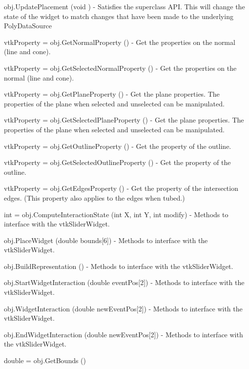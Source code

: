 \begin{DoxyItemize}
\item {\ttfamily obj.\-Update\-Placement (void )} -\/ Satisfies the superclass A\-P\-I. This will change the state of the widget to match changes that have been made to the underlying Poly\-Data\-Source  
\item {\ttfamily vtk\-Property = obj.\-Get\-Normal\-Property ()} -\/ Get the properties on the normal (line and cone).  
\item {\ttfamily vtk\-Property = obj.\-Get\-Selected\-Normal\-Property ()} -\/ Get the properties on the normal (line and cone).  
\item {\ttfamily vtk\-Property = obj.\-Get\-Plane\-Property ()} -\/ Get the plane properties. The properties of the plane when selected and unselected can be manipulated.  
\item {\ttfamily vtk\-Property = obj.\-Get\-Selected\-Plane\-Property ()} -\/ Get the plane properties. The properties of the plane when selected and unselected can be manipulated.  
\item {\ttfamily vtk\-Property = obj.\-Get\-Outline\-Property ()} -\/ Get the property of the outline.  
\item {\ttfamily vtk\-Property = obj.\-Get\-Selected\-Outline\-Property ()} -\/ Get the property of the outline.  
\item {\ttfamily vtk\-Property = obj.\-Get\-Edges\-Property ()} -\/ Get the property of the intersection edges. (This property also applies to the edges when tubed.)  
\item {\ttfamily int = obj.\-Compute\-Interaction\-State (int X, int Y, int modify)} -\/ Methods to interface with the vtk\-Slider\-Widget.  
\item {\ttfamily obj.\-Place\-Widget (double bounds\mbox{[}6\mbox{]})} -\/ Methods to interface with the vtk\-Slider\-Widget.  
\item {\ttfamily obj.\-Build\-Representation ()} -\/ Methods to interface with the vtk\-Slider\-Widget.  
\item {\ttfamily obj.\-Start\-Widget\-Interaction (double event\-Pos\mbox{[}2\mbox{]})} -\/ Methods to interface with the vtk\-Slider\-Widget.  
\item {\ttfamily obj.\-Widget\-Interaction (double new\-Event\-Pos\mbox{[}2\mbox{]})} -\/ Methods to interface with the vtk\-Slider\-Widget.  
\item {\ttfamily obj.\-End\-Widget\-Interaction (double new\-Event\-Pos\mbox{[}2\mbox{]})} -\/ Methods to interface with the vtk\-Slider\-Widget.  
\item {\ttfamily double = obj.\-Get\-Bounds ()}  

\end{DoxyItemize}
